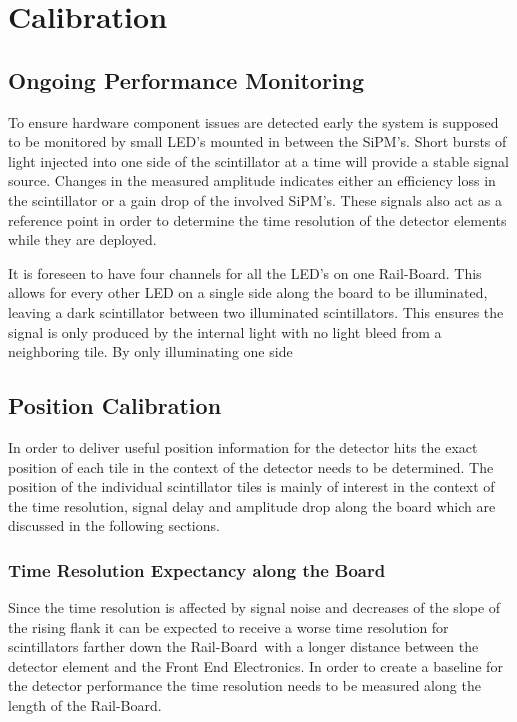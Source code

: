 \documentclass[12pt,a4paper,oneside]{article}
\newcommand{\railboard}{Rail-Board}
\newcommand{\sipms}{SiPM's}
\begin{document}
\section{Calibration}

\subsection{Ongoing Performance Monitoring}

To ensure hardware component issues are detected early the system is supposed to be monitored by small LED's mounted in between the \sipms .
Short bursts of light injected into one side of the scintillator at a time will provide a stable signal source.
Changes in the measured amplitude indicates either an efficiency loss in the scintillator or a gain drop of the involved \sipms .
These signals also act as a reference point in order to determine the time resolution of the detector elements while they are deployed.

It is foreseen to have four channels for all the LED's on one \railboard .
This allows for every other LED on a single side along the board to be illuminated, leaving a dark scintillator between two illuminated scintillators.
This ensures the signal is only produced by the internal light with no light bleed from a neighboring tile.
By only illuminating one side 

\subsection{Position Calibration}

In order to deliver useful position information for the detector hits the exact position of each tile in the context of the detector needs to be determined.
The position of the individual scintillator tiles is mainly of interest in the context of the time resolution, signal delay and amplitude drop along the board which are discussed in the following sections.

\subsubsection{Time Resolution Expectancy along the Board}

Since the time resolution is affected by signal noise and decreases of the slope of the rising flank it can be expected to receive a worse time resolution for scintillators farther down the \railboard\ with a longer distance between the detector element and the Front End Electronics.
In order to create a baseline for the detector performance the time resolution needs to be measured along the length of the \railboard .
\end{document}
